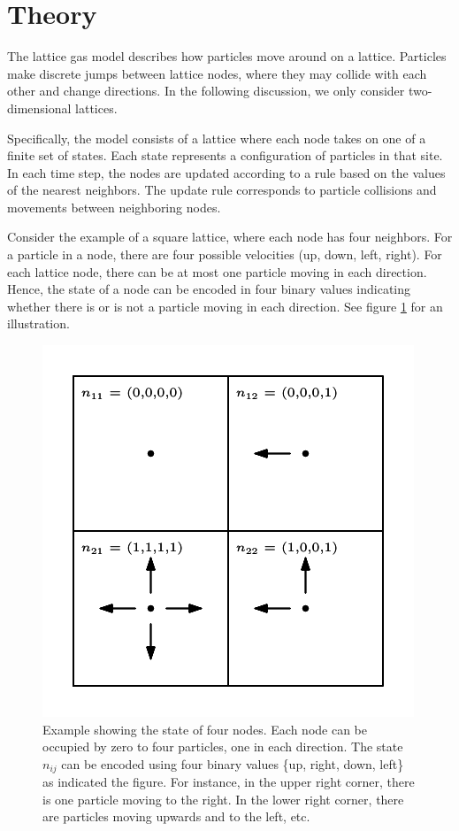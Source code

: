 \documentclass[12pt,a4paper]{article}
\begin{document}
\section{Theory}
\label{sec:theory}
The lattice gas model describes how particles move around on a lattice. Particles make discrete jumps between lattice nodes, where they may collide with each other and change directions. In the following discussion, we only consider two-dimensional lattices.

Specifically, the model consists of a lattice where each node takes on one of a finite set of states. Each state represents a configuration of particles in that site. In each time step, the nodes are updated according to a rule based on the values of the nearest neighbors. The update rule corresponds to particle collisions and movements between neighboring nodes.

Consider the example of a square lattice, where each node has four neighbors. For a particle in a node, there are four possible velocities (up, down, left, right). For each lattice node, there can be at most one particle moving in each direction. Hence, the state of a node can be encoded in four binary values indicating whether there is or is not a particle moving in each direction. See figure \ref{fig:square-state} for an illustration.

\begin{figure}[htp]
\centering
  \includegraphics{figs/square-state.pdf}
\caption{Example showing the state of four nodes. Each node can be occupied by zero to four particles, one in each direction. The state $n_{ij}$ can be encoded using four binary values \{up, right, down, left\} as indicated the figure. For instance, in the upper right corner, there is one particle moving to the right. In the lower right corner, there are particles moving upwards and to the left, etc.}
\label{fig:square-state}
\end{figure}
\end{document}
